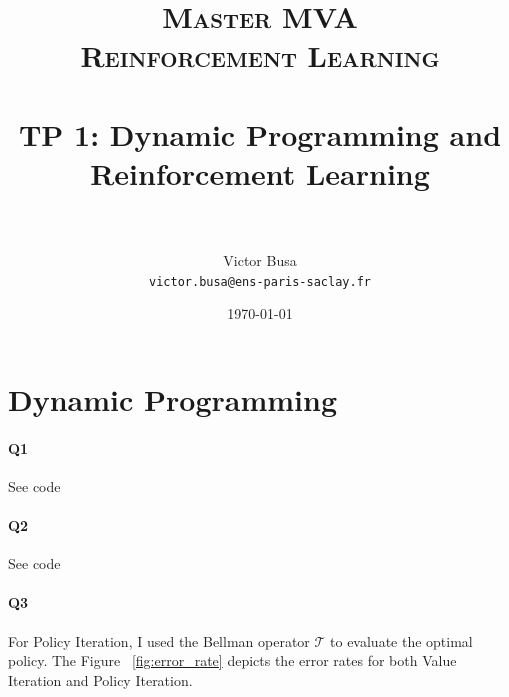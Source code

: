 \documentclass[11pt]{article}
\title{	
\normalfont \normalsize 
\textsc{Master MVA \\
Reinforcement Learning} \\ [20pt]
\horrule{0.5pt} \\[0.2cm] %
\textbf{TP 1}: Dynamic Programming and Reinforcement Learning \\
\horrule{2pt} \\[0.3cm] %
}
\author{Victor Busa \\
   \texttt{victor.busa@ens-paris-saclay.fr}}
\date{\normalsize\today}
\numberwithin{figure}{section} %
\begin{document}
\maketitle

\section{Dynamic Programming}
\paragraph{Q1} See code
\paragraph{Q2} See code
\paragraph{Q3} For Policy Iteration, I used the Bellman operator $\mathcal{T}$ to evaluate the optimal policy. The Figure ~\ref{fig:error_rate} depicts the error rates for both Value Iteration and Policy Iteration.
\end{document}
